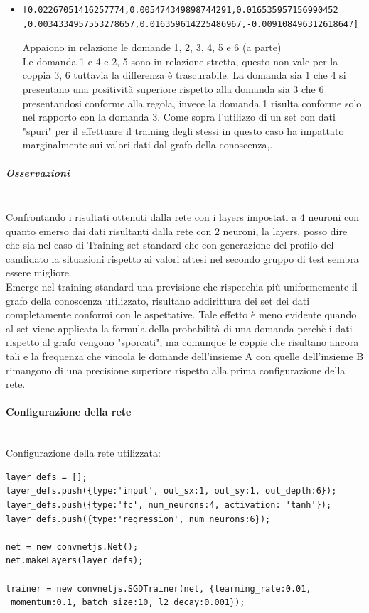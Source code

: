 \documentclass[10pt,a4paper]{article}
\begin{document}
\begin{itemize}
\item  \begin{verbatim}[0.02267051416257774,0.005474349898744291,0.016535957156990452
,0.0034334957553278657,0.016359614225486967,-0.009108496312618647]\end{verbatim}
Appaiono in relazione le domande 1, 2, 3, 4, 5  e 6 (a parte)\\
Le domanda 1 e 4 e 2, 5  sono in relazione stretta, questo non vale per la coppia 3, 6  tuttavia la differenza \`e trascurabile.
La domanda sia 1 che 4 si presentano una positivit\`a superiore rispetto alla domanda sia 3 che 6 presentandosi conforme alla regola, invece la domanda 1 risulta conforme solo nel rapporto con la domanda 3. Come sopra l'utilizzo di  un set con dati "spuri" per il effettuare il training degli stessi in questo caso ha impattato marginalmente sui valori dati dal grafo della conoscenza,.
\end{itemize}

\subparagraph{Osservazioni}\mbox{}
\label{Osservazioni su rete a 2 neuroni}
\\
Confrontando i risultati ottenuti dalla rete con i layers impostati a 4 neuroni con quanto emerso dai dati risultanti dalla  rete con 2 neuroni, la layers, posso dire che sia nel caso di Training set standard che con generazione del profilo del candidato la situazioni rispetto ai valori attesi nel secondo gruppo di test sembra essere migliore.\\
Emerge nel training standard una previsione che rispecchia pi\`u uniformemente il grafo della conoscenza utilizzato, risultano  addirittura dei set dei dati completamente conformi con le aspettative. Tale effetto \`e meno evidente quando al set viene applicata la formula della probabilit\`a di una domanda perch\`e i dati rispetto al grafo vengono "sporcati"; ma comunque le coppie che risultano ancora tali e la frequenza che vincola le domande dell'insieme A con quelle dell'insieme B rimangono di una precisione superiore rispetto alla prima configurazione della rete.


\paragraph{Configurazione della rete}\mbox{}
\label{Configurazione della rete 4 neuroni per 1 layers}
\\
Configurazione della rete utilizzata:\\
\begin{verbatim}layer_defs = [];
layer_defs.push({type:'input', out_sx:1, out_sy:1, out_depth:6});
layer_defs.push({type:'fc', num_neurons:4, activation: 'tanh'});
layer_defs.push({type:'regression', num_neurons:6});

net = new convnetjs.Net();
net.makeLayers(layer_defs);

trainer = new convnetjs.SGDTrainer(net, {learning_rate:0.01,
 momentum:0.1, batch_size:10, l2_decay:0.001});
\end{verbatim}
\end{document}
